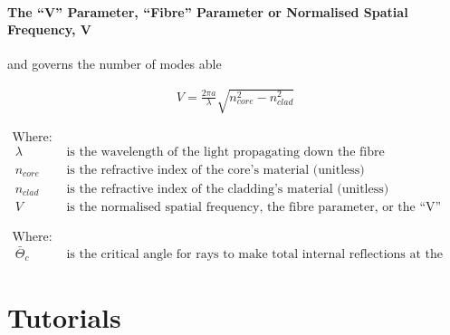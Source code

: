 \documentclass[colorlinks,11pt,a4paper,normalphoto,withhyper,ragged2e]{altareport}
\begin{document}
\paragraph{The ``V'' Parameter, ``Fibre'' Parameter or Normalised Spatial Frequency, $\textbf{V}$ \linebreak}

 and governs the number of modes able 

\begin{paracol}{2}

\medskip

\setlength{\jot}{2ex}
\begin{align}
	V = \frac{2 \pi a}{\lambda}\sqrt{n_{core}^2 - n_{clad}^2} \nonumber
\end{align}

\switchcolumn

\setlength{\jot}{1ex}
\begin{align}
	\text{Where:}& \nonumber\\\
	\lambda & \text{ is the wavelength of the light propagating down the fibre} \nonumber\\\
	n_{core} & \text{ is the refractive index of the core's material (unitless)} \nonumber\\\
	n_{clad} & \text{ is the refractive index of the cladding's material (unitless)} \nonumber\\\
	V & \text{ is the normalised spatial frequency, the fibre parameter, or the ``V'' parameter} \nonumber\
\end{align}

\end{paracol}



\begin{align}
	\text{Where:}& \nonumber\\\
	\bar{\Theta}_c & \text{ is the critical angle for rays to make total internal reflections at the core-cladding boundary (Radians)} \nonumber\
\end{align}




\newpage




\section{Tutorials}
\end{document}
